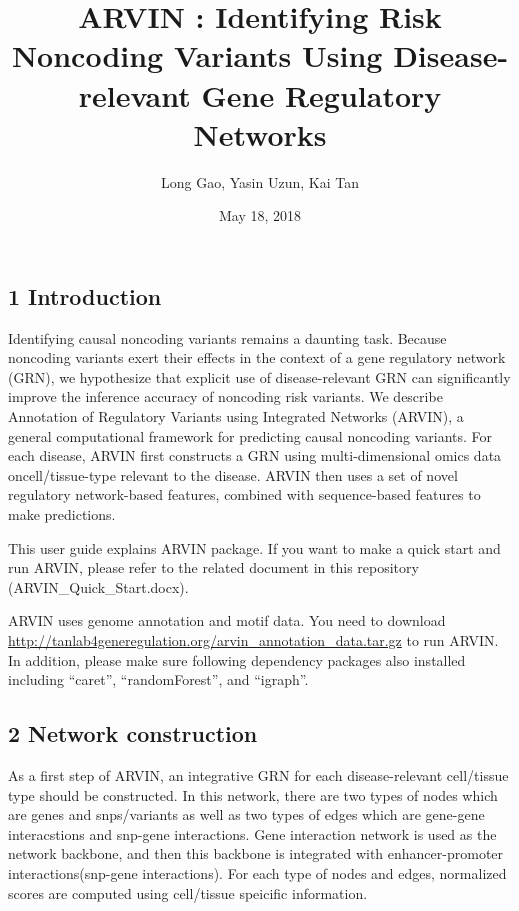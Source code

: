 \documentclass[]{article}
\title{ARVIN : Identifying Risk Noncoding Variants Using Disease-relevant Gene
Regulatory Networks}
\author{Long Gao, Yasin Uzun, Kai Tan}
\date{May 18, 2018}
\begin{document}
\maketitle

{
\setcounter{tocdepth}{4}
\tableofcontents
}
\subsection{1 Introduction}\label{introduction}

Identifying causal noncoding variants remains a daunting task. Because
noncoding variants exert their effects in the context of a gene
regulatory network (GRN), we hypothesize that explicit use of
disease-relevant GRN can significantly improve the inference accuracy of
noncoding risk variants. We describe Annotation of Regulatory Variants
using Integrated Networks (ARVIN), a general computational framework for
predicting causal noncoding variants. For each disease, ARVIN first
constructs a GRN using multi-dimensional omics data oncell/tissue-type
relevant to the disease. ARVIN then uses a set of novel regulatory
network-based features, combined with sequence-based features to make
predictions.

This user guide explains ARVIN package. If you want to make a quick
start and run ARVIN, please refer to the related document in this
repository (ARVIN\_Quick\_Start.docx).

ARVIN uses genome annotation and motif data. You need to download
\url{http://tanlab4generegulation.org/arvin_annotation_data.tar.gz} to
run ARVIN. In addition, please make sure following dependency packages
also installed including ``caret'', ``randomForest'', and ``igraph''.

\subsection{2 Network construction}\label{network-construction}

As a first step of ARVIN, an integrative GRN for each disease-relevant
cell/tissue type should be constructed. In this network, there are two
types of nodes which are genes and snps/variants as well as two types of
edges which are gene-gene interacstions and snp-gene interactions. Gene
interaction network is used as the network backbone, and then this
backbone is integrated with enhancer-promoter interactions(snp-gene
interactions). For each type of nodes and edges, normalized scores are
computed using cell/tissue speicific information.
\end{document}
